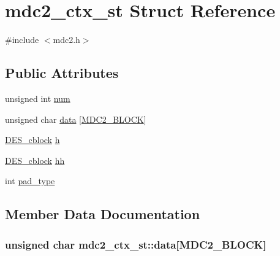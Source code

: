 \hypertarget{structmdc2__ctx__st}{}\section{mdc2\+\_\+ctx\+\_\+st Struct Reference}
\label{structmdc2__ctx__st}


{\ttfamily \#include $<$mdc2.\+h$>$}

\subsection*{Public Attributes}
\begin{DoxyCompactItemize}
\item 
unsigned int \hyperlink{structmdc2__ctx__st_af85d040e72cfb4508023fb0ea68fcd77}{num}
\item 
unsigned char \hyperlink{structmdc2__ctx__st_a22f4408c4f13d5e2f7669cd58eca2026}{data} \mbox{[}\hyperlink{mdc2_8h_a3de1874e1a6ec169df18c08da2a642de}{M\+D\+C2\+\_\+\+B\+L\+O\+CK}\mbox{]}
\item 
\hyperlink{des_8h_adcbbb795f912b83b7aa8c2660eb1bee4}{D\+E\+S\+\_\+cblock} \hyperlink{structmdc2__ctx__st_affcbad02a87a1e029e62afafc4d587de}{h}
\item 
\hyperlink{des_8h_adcbbb795f912b83b7aa8c2660eb1bee4}{D\+E\+S\+\_\+cblock} \hyperlink{structmdc2__ctx__st_afd6b835d0ca4e70e3b046bd88c10aa8b}{hh}
\item 
int \hyperlink{structmdc2__ctx__st_a98ad50463fcdc70534875520374dd08d}{pad\+\_\+type}
\end{DoxyCompactItemize}


\subsection{Member Data Documentation}
\subsubsection[{\texorpdfstring{data}{data}}]{\setlength{\rightskip}{0pt plus 5cm}unsigned char mdc2\+\_\+ctx\+\_\+st\+::data\mbox{[}{\bf M\+D\+C2\+\_\+\+B\+L\+O\+CK}\mbox{]}}\hypertarget{structmdc2__ctx__st_a22f4408c4f13d5e2f7669cd58eca2026}{}\label{structmdc2__ctx__st_a22f4408c4f13d5e2f7669cd58eca2026}

